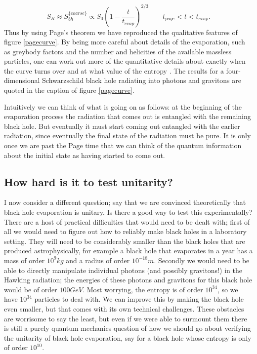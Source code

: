 \documentclass[12pt]{article}
\newcommand{\be}{\begin{equation}}
\newcommand{\ee}{\end{equation}}
\begin{document}
\be
S_R\approx S_{\mathit{bh}}^{\{coarse\}}\propto S_0\left(1-\frac{t}{t_{\mathit{evap}}}\right)^{2/3} \qquad t_{page}<t<t_{\mathit{evap}}.
\ee
Thus by using Page's theorem we have reproduced the qualitative features of figure \ref{pagecurve}.  By being more careful about details of the evaporation, such as greybody factors and the number and helicities of the available massless particles, one can work out more of the quantitative details about exactly when the curve turns over and at what value of the entropy \cite{Page:2013dx}.  The results for a four-dimensional Schwarzschild black hole radiating into photons and gravitons are quoted in the caption of figure \ref{pagecurve}.

Intuitively we can think of what is going on as follows: at the beginning of the evaporation process the radiation that comes out is entangled with the remaining black hole.  But eventually it must start coming out entangled with the earlier radiation, since eventually the final state of the radiation must be pure.  It is only once we are past the Page time that we can think of the quantum information about the initial state as having started to come out.

\subsection{How hard is it to test unitarity?}\label{testUsec}
I now consider a different question; say that we are convinced theoretically that black hole evaporation is unitary.  Is there a good way to test this experimentally?  There are a host of practical difficulties that would need to be dealt with; first of all we would need to figure out how to reliably make black holes in a laboratory setting.  They will need to be considerably smaller than the black holes that are produced astrophysically, for example a black hole that evaporates in a year has a mass of order $10^9 kg$ and a radius of order $10^{-18}m$.  Secondly we would need to be able to directly manipulate individual photons (and possibly gravitons!) in the Hawking radiation; the energies of these photons and gravitons for this black hole would be of order $100GeV$. Most worrying, the entropy is of order $10^{34}$, so we have $10^{34}$ particles to deal with.  We can improve this by making the black hole even smaller, but that comes with its own technical challenges.  These obstacles are worrisome to say the least, but even if we were able to surmount them there is still a purely quantum mechanics question of how we should go about verifying the unitarity of black hole evaporation, say for a black hole whose entropy is only of order $10^{10}$.     
\end{document}
